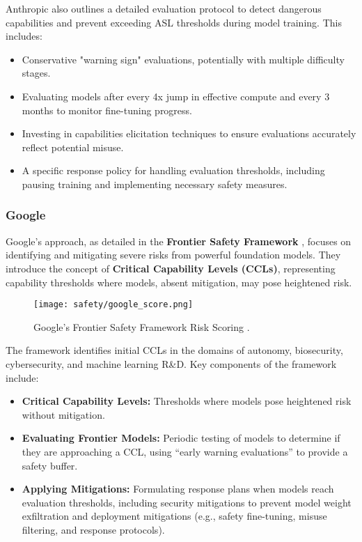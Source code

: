 Anthropic also outlines a detailed evaluation protocol to detect dangerous capabilities and prevent exceeding ASL thresholds during model training. This includes:

\begin{itemize}
    \item Conservative "warning sign" evaluations, potentially with multiple difficulty stages.
    \item Evaluating models after every 4x jump in effective compute and every 3 months to monitor fine-tuning progress.
    \item Investing in capabilities elicitation techniques to ensure evaluations accurately reflect potential misuse.
    \item A specific response policy for handling evaluation thresholds, including pausing training and implementing necessary safety measures.
\end{itemize}

\subsubsection{Google}

Google's approach, as detailed in the \textbf{Frontier Safety Framework} , focuses on identifying and mitigating severe risks from powerful foundation models. They introduce the concept of \textbf{Critical Capability Levels (CCLs)}, representing capability thresholds where models, absent mitigation, may pose heightened risk.

\begin{figure}[H]
\centering
\texttt{[image: safety/google\_score.png]}
\caption{Google's Frontier Safety Framework Risk Scoring \cite{deepmind2024frontier}.}
\label{google-risk-scoring}
\end{figure}

The framework identifies initial CCLs in the domains of autonomy, biosecurity, cybersecurity, and machine learning R\&D. Key components of the framework include:

\begin{itemize}
    \item \textbf{Critical Capability Levels:} Thresholds where models pose heightened risk without mitigation.
    \item \textbf{Evaluating Frontier Models:} Periodic testing of models to determine if they are approaching a CCL, using ``early warning evaluations'' to provide a safety buffer.
    \item \textbf{Applying Mitigations:} Formulating response plans when models reach evaluation thresholds, including security mitigations to prevent model weight exfiltration and deployment mitigations (e.g., safety fine-tuning, misuse filtering, and response protocols).
\end{itemize}

